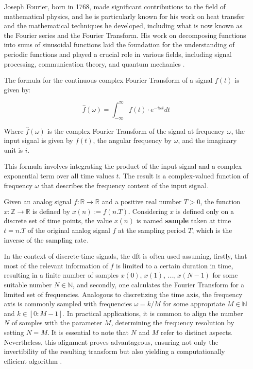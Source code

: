 Joseph Fourier, born in 1768, made significant contributions to the field of mathematical physics, and he is particularly known for his work on heat transfer and the mathematical techniques he developed, including what is now known as the Fourier series and the Fourier Transform. His work on decomposing functions into sums of sinusoidal functions laid the foundation for the understanding of periodic functions and played a crucial role in various fields, including signal processing, communication theory, and quantum mechanics \cite{Debnath2014}.

The formula for the continuous complex Fourier Transform of a signal $f(t)$ is given by:

\begin{equation}
    \label{eq:frmwk_audio_fund_fft}
    \hat{f}(\omega)=\int_{-\infty}^{\infty} f(t) \cdot e^{-i \omega t} d t
\end{equation}

Where $\hat{f}(\omega)$ is the complex Fourier Transform of the signal at frequency $\omega$, the input signal is given by $f(t)$, the angular frequency by $\omega$, and the imaginary unit is $i$.

This formula involves integrating the product of the input signal and a complex exponential term over all time values $t$. The result is a complex-valued function of frequency $\omega$ that describes the frequency content of the input signal.

Given an analog signal $f : \mathbb{R} \rightarrow \mathbb{R}$ and a positive real number $T > 0$, the function $x : \mathbb{Z} \rightarrow \mathbb{R}$ is defined by $x(n):= f(n.T)$. Considering $x$ is defined only on a discrete set of time points, the value $x(n)$ is named \textbf{sample} taken at time $t = n.T$ of the original analog signal $f$ at the sampling period $T$, which is the inverse of the sampling rate.

In the context of discrete-time signals, the \gls{dft} is often used assuming, firstly, that most of the relevant information of $f$ is limited to a certain duration in time, resulting in a finite number of samples $x(0)$, $x(1)$, $\ldots$, $x(N-1)$ for some suitable number $N\in\mathbb{N} $, and secondly, one calculates the Fourier Transform for a limited set of frequencies. Analogous to discretizing the time axis, the frequency axis is commonly sampled with frequencies $\omega = k/M$ for some appropriate $M\in\mathbb{N} $ and $k \in [0: M-1]$. In practical applications, it is common to align the number $N$ of samples with the parameter $M$, determining the frequency resolution by setting $N = M$. It is essential to note that $N$ and $M$ refer to distinct aspects. Nevertheless, this alignment proves advantageous, ensuring not only the invertibility of the resulting transform but also yielding a computationally efficient algorithm \cite{Mueller2021}.

